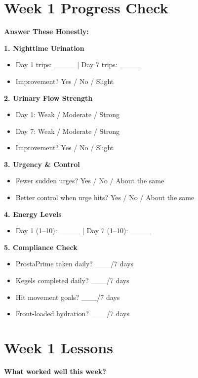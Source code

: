 \documentclass[11pt,oneside]{book}
\begin{document}
\section*{Week 1 Progress Check}

\textbf{Answer These Honestly:}

\textbf{1. Nighttime Urination}
\begin{itemize}[leftmargin=*]
\item Day 1 trips: \_\_\_\_ | Day 7 trips: \_\_\_\_
\item Improvement? Yes / No / Slight
\end{itemize}

\textbf{2. Urinary Flow Strength}
\begin{itemize}[leftmargin=*]
\item Day 1: Weak / Moderate / Strong
\item Day 7: Weak / Moderate / Strong
\item Improvement? Yes / No / Slight
\end{itemize}

\textbf{3. Urgency \& Control}
\begin{itemize}[leftmargin=*]
\item Fewer sudden urges? Yes / No / About the same
\item Better control when urge hits? Yes / No / About the same
\end{itemize}

\textbf{4. Energy Levels}
\begin{itemize}[leftmargin=*]
\item Day 1 (1--10): \_\_\_\_ | Day 7 (1--10): \_\_\_\_
\end{itemize}

\textbf{5. Compliance Check}
\begin{itemize}[leftmargin=*]
\item ProstaPrime taken daily? \_\_\_/7 days
\item Kegels completed daily? \_\_\_/7 days
\item Hit movement goals? \_\_\_/7 days
\item Front-loaded hydration? \_\_\_/7 days
\end{itemize}

\section*{Week 1 Lessons}

\textbf{What worked well this week?}
\end{document}
